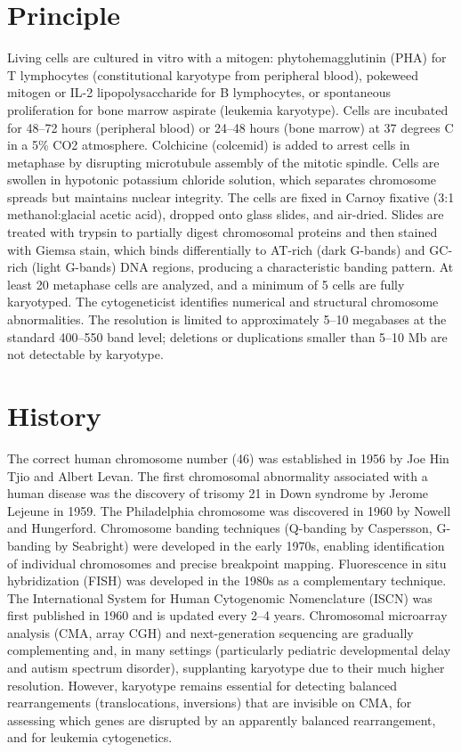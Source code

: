 \section*{Principle}
Living cells are cultured in vitro with a mitogen: phytohemagglutinin (PHA) for T lymphocytes (constitutional karyotype from peripheral blood), pokeweed mitogen or IL-2 lipopolysaccharide for B lymphocytes, or spontaneous proliferation for bone marrow aspirate (leukemia karyotype). Cells are incubated for 48--72 hours (peripheral blood) or 24--48 hours (bone marrow) at 37 degrees C in a 5\% CO2 atmosphere. Colchicine (colcemid) is added to arrest cells in metaphase by disrupting microtubule assembly of the mitotic spindle. Cells are swollen in hypotonic potassium chloride solution, which separates chromosome spreads but maintains nuclear integrity. The cells are fixed in Carnoy fixative (3:1 methanol:glacial acetic acid), dropped onto glass slides, and air-dried. Slides are treated with trypsin to partially digest chromosomal proteins and then stained with Giemsa stain, which binds differentially to AT-rich (dark G-bands) and GC-rich (light G-bands) DNA regions, producing a characteristic banding pattern. At least 20 metaphase cells are analyzed, and a minimum of 5 cells are fully karyotyped. The cytogeneticist identifies numerical and structural chromosome abnormalities. The resolution is limited to approximately 5--10 megabases at the standard 400--550 band level; deletions or duplications smaller than 5--10 Mb are not detectable by karyotype.

\section*{History}
The correct human chromosome number (46) was established in 1956 by Joe Hin Tjio and Albert Levan. The first chromosomal abnormality associated with a human disease was the discovery of trisomy 21 in Down syndrome by Jerome Lejeune in 1959. The Philadelphia chromosome was discovered in 1960 by Nowell and Hungerford. Chromosome banding techniques (Q-banding by Caspersson, G-banding by Seabright) were developed in the early 1970s, enabling identification of individual chromosomes and precise breakpoint mapping. Fluorescence in situ hybridization (FISH) was developed in the 1980s as a complementary technique. The International System for Human Cytogenomic Nomenclature (ISCN) was first published in 1960 and is updated every 2--4 years. Chromosomal microarray analysis (CMA, array CGH) and next-generation sequencing are gradually complementing and, in many settings (particularly pediatric developmental delay and autism spectrum disorder), supplanting karyotype due to their much higher resolution. However, karyotype remains essential for detecting balanced rearrangements (translocations, inversions) that are invisible on CMA, for assessing which genes are disrupted by an apparently balanced rearrangement, and for leukemia cytogenetics.

